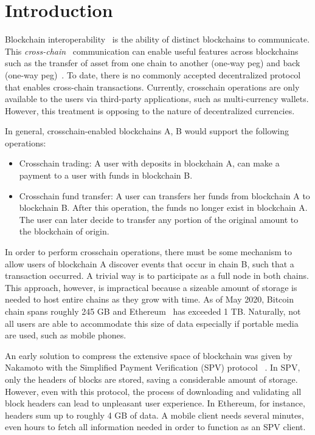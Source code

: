 \section{Introduction}

Blockchain interoperability~\cite{dionyziz} is the ability of distinct
blockchains to communicate.  This \emph{cross-chain}~\cite{pow-sidechains,
pos-sidechains,burn,crosschain-sok, gtklocker} communication can enable useful
features across blockchains such as the transfer of asset from one chain to
another (one-way peg) and back (one-way peg)~\cite{pow-sidechains}. To date,
there is no commonly accepted decentralized protocol that enables cross-chain
transactions.  Currently, crosschain operations are only available to the users
via third-party applications, such as multi-currency wallets. However, this
treatment is opposing to the nature of decentralized currencies.

\noindent

In general, crosschain-enabled blockchains A, B would support the following
operations:

\begin{itemize}
\item Crosschain trading: A user with deposits in blockchain A, can make a
    payment to a user with funds in blockchain B.
\item Crosschain fund transfer: A user can transfers her funds from blockchain
    A to blockchain B. After this operation, the funds no longer exist in
    blockchain A. The user can later decide to transfer any portion of the
    original amount to the blockchain of origin.
\end{itemize}


\noindent

In order to perform crosschain operations, there must be some mechanism to
allow users of blockchain A discover events that occur in chain B, such that a
transaction occurred. A trivial way is to participate as a full node in both
chains. This approach, however, is impractical because a sizeable amount of
storage is needed to host entire chains as they grow with time. As of May 2020,
Bitcoin~\cite{nakamoto} chain spans roughly 245 GB and Ethereum~\cite{wood,
buterin} has exceeded 1 TB. Naturally, not all users are able to accommodate
this size of data especially if portable media are used, such as mobile phones.

An early solution to compress the extensive space of blockchain was given by
Nakamoto with the Simplified Payment Verification (SPV) protocol
~\cite{nakamoto}. In SPV, only the headers of blocks are stored, saving a
considerable amount of storage.  However, even with this protocol, the process
of downloading and validating all block headers can lead to unpleasant user
experience. In Ethereum, for instance, headers sum up to roughly 4 GB of data.
A mobile client needs several minutes, even hours to fetch all information
needed in order to function as an SPV client.

